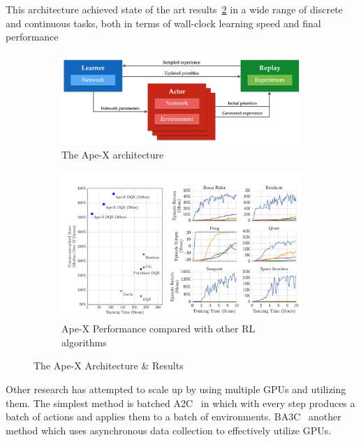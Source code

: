 This architecture achieved state of the art results~\ref{fig:apex_results} in a wide range of discrete and continuous tasks, both in terms of wall-clock learning speed and final performance

\begin{figure}[!htb]
		\centering
		\begin{subfigure}[b]{0.4\textwidth}
				\centering
				\includegraphics[width=\textwidth]{figures/algos/apex.png}
				\caption{The Ape-X architecture}
				\label{fig:apex_arch}
		\end{subfigure}
		\hfill
		\begin{subfigure}[b]{0.4\textwidth}
				\centering
				\includegraphics[width=\textwidth]{figures/algos/apex_results.png}
				\caption{Ape-X Performance compared with other RL algorithms}
				\label{fig:apex_results}
		\end{subfigure}
		\hfill
		 \caption{The Ape-X Architecture \& Results}
		 \label{fig:apex}
\end{figure}

Other research has attempted to scale up by using multiple GPUs and utilizing them. The simplest method is batched A2C~\parencite{clemente2017efficient} in which with every step produces a batch of actions and applies them to a batch of environments. BA3C~\parencite{babaeizadeh2016ga3c} another method which uses asynchronous data collection to effectively utilize GPUs.

